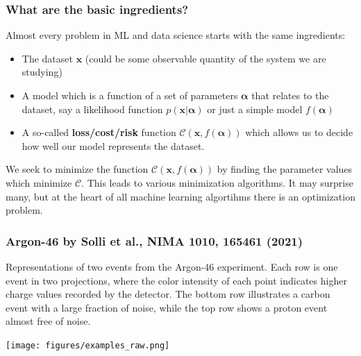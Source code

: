 \documentclass{beamer}
\begin{document}
\begin{frame}
\frametitle{What are the basic ingredients?}

\begin{block}{}
Almost every problem in ML and data science starts with the same ingredients:
\begin{itemize}
\item The dataset $\mathbf{x}$ (could be some observable quantity of the system we are studying)

\item A model which is a function of a set of parameters $\mathbf{\alpha}$ that relates to the dataset, say a likelihood  function $p(\mathbf{x}\vert \mathbf{\alpha})$ or just a simple model $f(\mathbf{\alpha})$

\item A so-called \textbf{loss/cost/risk} function $\mathcal{C} (\mathbf{x}, f(\mathbf{\alpha}))$ which allows us to decide how well our model represents the dataset. 
\end{itemize}

\noindent
We seek to minimize the function $\mathcal{C} (\mathbf{x}, f(\mathbf{\alpha}))$ by finding the parameter values which minimize $\mathcal{C}$. This leads to  various minimization algorithms. It may surprise many, but at the heart of all machine learning algortihms there is an optimization problem. 
\end{block}
\end{frame}

\begin{frame}
\frametitle{Argon-46 by Solli et al., NIMA 1010, 165461 (2021)}

\begin{block}{}
Representations of two events from the
Argon-46 experiment. Each row is one event in two projections,
where the color intensity of each point indicates higher charge values
recorded by the detector. The bottom row illustrates a carbon event with
a large fraction of noise, while the top row shows a proton event
almost free of noise. 
\end{block}

\vspace{6mm}

\centerline{\texttt{[image: figures/examples\_raw.png]}}

\vspace{6mm}
\end{frame}
\end{document}
